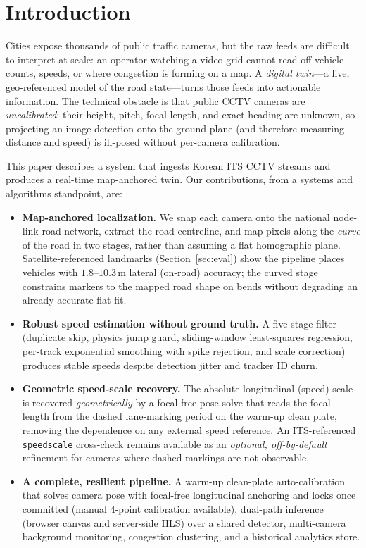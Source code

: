 \documentclass[conference]{IEEEtran}
\renewcommand{\_}{\textunderscore\allowbreak}
\begin{document}
\section{Introduction}
Cities expose thousands of public traffic cameras, but the raw feeds are difficult
to interpret at scale: an operator watching a video grid cannot read off vehicle
counts, speeds, or where congestion is forming on a map. A \emph{digital twin}---a
live, geo-referenced model of the road state---turns those feeds into actionable
information. The technical obstacle is that public CCTV cameras are
\emph{uncalibrated}: their height, pitch, focal length, and exact heading are
unknown, so projecting an image detection onto the ground plane (and therefore
measuring distance and speed) is ill-posed without per-camera calibration.

This paper describes a system that ingests Korean ITS CCTV streams and produces a
real-time map-anchored twin. Our contributions, from a systems and algorithms
standpoint, are:

\begin{itemize}
  \item \textbf{Map-anchored localization.} We snap each camera onto the national
  node-link road network, extract the road centreline, and map pixels along the
  \emph{curve} of the road in two stages, rather than assuming a flat homographic
  plane. Satellite-referenced landmarks (Section~\ref{sec:eval}) show the pipeline
  places vehicles with $1.8$--$10.3$\,m lateral (on-road) accuracy; the curved stage
  constrains markers to the mapped road shape on bends without degrading an
  already-accurate flat fit.
  \item \textbf{Robust speed estimation without ground truth.} A five-stage filter
  (duplicate skip, physics jump guard, sliding-window least-squares regression,
  per-track exponential smoothing with spike rejection, and scale correction)
  produces stable speeds despite detection jitter and tracker ID churn.
  \item \textbf{Geometric speed-scale recovery.} The absolute longitudinal (speed) scale is
  recovered \emph{geometrically} by a focal-free pose solve that reads the focal length from
  the dashed lane-marking period on the warm-up clean plate, removing the dependence on any
  external speed reference. An ITS-referenced \texttt{speed\_scale} cross-check remains
  available as an \emph{optional, off-by-default} refinement for cameras where dashed
  markings are not observable.
  \item \textbf{A complete, resilient pipeline.} A warm-up clean-plate auto-calibration
  that solves camera pose with focal-free longitudinal anchoring and locks once committed
  (manual 4-point calibration available), dual-path inference (browser canvas and
  server-side HLS) over a shared detector, multi-camera background monitoring, congestion
  clustering, and a historical analytics store.
\end{itemize}
\end{document}
